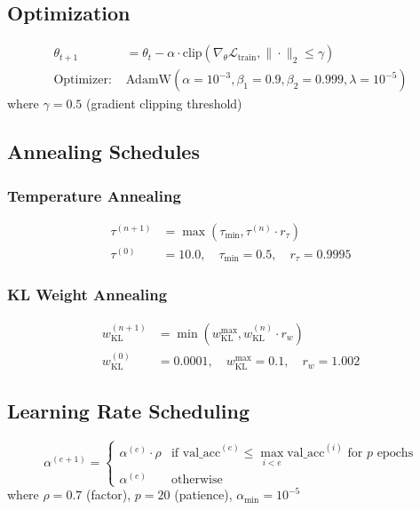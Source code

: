\documentclass[11pt]{article}
\begin{document}
\subsection{Optimization}
\begin{align}
\theta_{t+1} &= \theta_t - \alpha \cdot \text{clip}(\nabla_\theta \mathcal{L}_{\text{train}}, \|\cdot\|_2 \leq \gamma) \\
\text{Optimizer: } &\text{AdamW}(\alpha = 10^{-3}, \beta_1 = 0.9, \beta_2 = 0.999, \lambda = 10^{-5})
\end{align}
where $\gamma = 0.5$ (gradient clipping threshold)

\subsection{Annealing Schedules}

\subsubsection{Temperature Annealing}
\begin{align}
\tau^{(n+1)} &= \max(\tau_{\min}, \tau^{(n)} \cdot r_\tau) \\
\tau^{(0)} &= 10.0, \quad \tau_{\min} = 0.5, \quad r_\tau = 0.9995
\end{align}

\subsubsection{KL Weight Annealing}
\begin{align}
w_{\text{KL}}^{(n+1)} &= \min(w_{\text{KL}}^{\max}, w_{\text{KL}}^{(n)} \cdot r_w) \\
w_{\text{KL}}^{(0)} &= 0.0001, \quad w_{\text{KL}}^{\max} = 0.1, \quad r_w = 1.002
\end{align}

\subsection{Learning Rate Scheduling}
\begin{equation}
\alpha^{(e+1)} = \begin{cases}
\alpha^{(e)} \cdot \rho & \text{if } \text{val\_acc}^{(e)} \leq \max_{i<e}\text{val\_acc}^{(i)} \text{ for } p \text{ epochs} \\
\alpha^{(e)} & \text{otherwise}
\end{cases}
\end{equation}
where $\rho = 0.7$ (factor), $p = 20$ (patience), $\alpha_{\min} = 10^{-5}$
\end{document}
